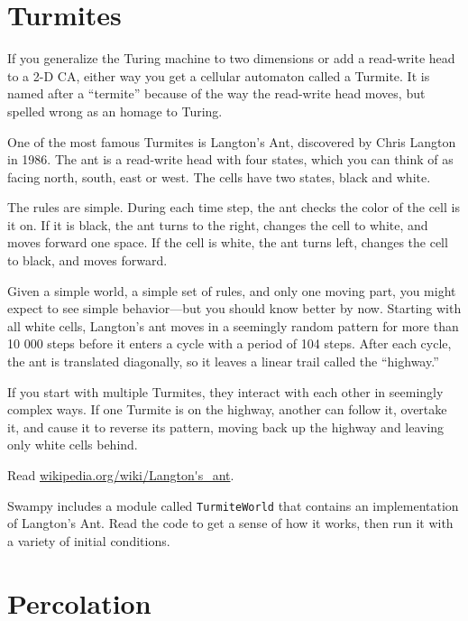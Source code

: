 \documentclass[10pt]{book}
\begin{document}
\section{Turmites}

If you generalize the Turing machine to two dimensions or
add a read-write head to a 2-D CA, either way you get a
cellular automaton called a Turmite.  It is named after a
``termite'' because of the way the read-write head moves, but
spelled wrong as an homage to Turing. 

One of the most famous Turmites is Langton's Ant, discovered
by Chris Langton in 1986.  The ant is a read-write head with
four states, which you can think of as facing north, south,
east or west.  The cells have two states, black and white.

The rules are simple.  During each time step, the ant checks the color
of the cell is it on.  If it is black, the ant turns to the right,
changes the cell to white, and moves forward one space.  If the cell
is white, the ant turns left, changes the cell to black, and moves
forward.

Given a simple world, a simple set of rules, and only one moving part,
you might expect to see simple behavior---but you should know
better by now.  Starting with all white cells, Langton's ant
moves in a seemingly random pattern for more than 10 000 steps
before it enters a cycle with a period of 104 steps.  After
each cycle, the ant is translated diagonally, so it leaves
a linear trail called the ``highway.''

If you start with multiple Turmites, they interact with each
other in seemingly complex ways.  If one Turmite is on the
highway, another can follow it, overtake it, and cause it to
reverse its pattern, moving back up the highway and leaving
only white cells behind.  

\begin{ex}

Read \url{wikipedia.org/wiki/Langton's_ant}.

Swampy includes a module called {\tt TurmiteWorld} that contains
an implementation of Langton's Ant.  Read the code to get a sense
of how it works, then run it with a variety of initial conditions.

\end{ex}


\section{Percolation}
\end{document}

